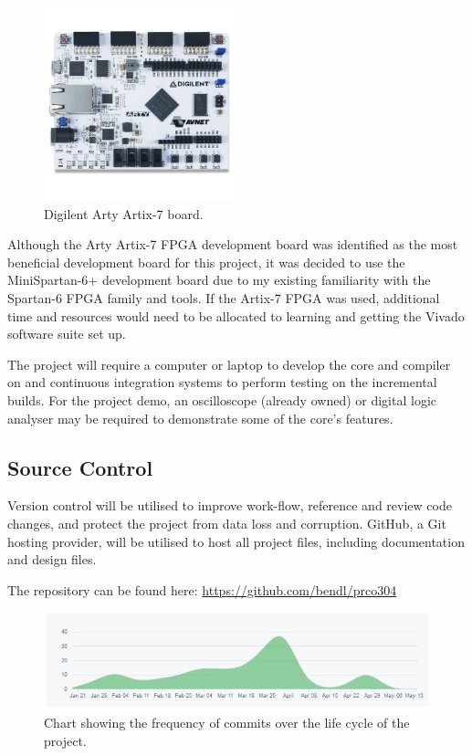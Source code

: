 \documentclass[11pt,a4paper]{report}
\begin{document}
\begin{enumerate}
{\begin{figure}[H]
\centering
     \includegraphics[width=0.5\textwidth]{arty}
      \caption{Digilent Arty Artix-7 board.}
       \label{fig:res:arty}
\end{figure}
}
\end{enumerate}

Although the Arty Artix-7 FPGA development board was identified as the most beneficial development board for this project, it was decided to use the MiniSpartan-6+ development board due to my existing familiarity with the Spartan-6 FPGA family and tools. If the Artix-7 FPGA was used, additional time and resources would need to be allocated to learning and getting the Vivado software suite set up.

The project will require a computer or laptop to develop the core and compiler on and continuous integration systems to perform testing on the incremental builds. For the project demo, an oscilloscope (already owned) or digital logic analyser may be required to demonstrate some of the core's features.

\subsection{Source Control}
Version control will be utilised to improve work-flow, reference and review code changes, and protect the project from data loss and corruption. GitHub, a Git hosting provider, will be utilised to host all project files, including documentation and design files.

The repository can be found here: \href{https://github.com/bendl/prco304}{https://github.com/bendl/prco304}

\begin{figure}[H]
\centering
\includegraphics[scale=0.7]{github}
\caption{Chart showing the frequency of commits over the life cycle of the project.}
\end{figure}
\end{document}

